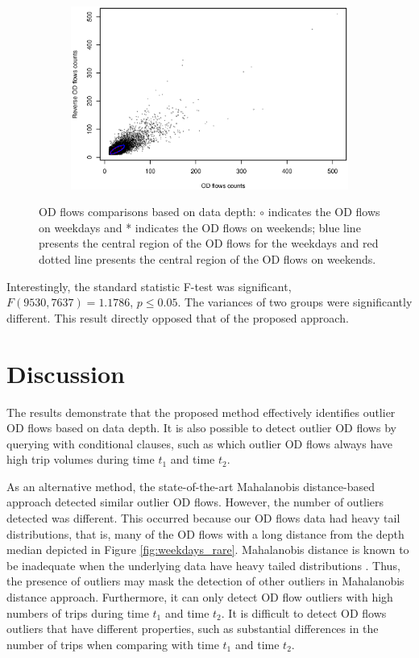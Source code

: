 \documentclass[a4paper,UKenglish]{lipics-v2018}
\begin{document}
\begin{figure}
	\centering
	\begin{subfigure}[b]{0.7\textwidth}
		\includegraphics[width=\textwidth]{images/com_weekdays_weekends.eps}
	\end{subfigure}
	\caption{OD flows comparisons based on data depth: $\circ$ indicates the OD flows on weekdays and * indicates the OD flows on weekends; blue line presents the central region of the OD flows for the weekdays and red dotted line presents the central region of the OD flows on weekends. }\label{fig:OD_comparisons}	
\end{figure}

Interestingly, the standard statistic F-test was significant, $F(9530,7637) =1.1786$, $p \leq 0.05$.
The variances of two groups were significantly different. 
This result directly opposed that of the proposed approach.


\section{Discussion}
\label{sec:discussion}
The results demonstrate that the proposed method effectively identifies outlier OD flows based on data depth.
It is also possible to detect outlier OD flows by querying with conditional clauses, such as which outlier OD flows always have high trip volumes during time $t_1$ and time $t_2$.

As an alternative method, the state-of-the-art Mahalanobis distance-based approach detected similar outlier OD flows.
However, the number of outliers detected was different.
This occurred because our OD flows data had heavy tail distributions, that is, many of the OD flows with a long distance from the depth median depicted in Figure \ref{fig:weekdays_rare}. 
Mahalanobis distance is known to be inadequate when the underlying data have heavy tailed distributions \cite{wilcox12Book}. 
Thus, the presence of outliers may mask the detection of other outliers in Mahalanobis distance approach.
Furthermore, it can only detect OD flow outliers with high numbers of trips during time $t_1$ and time $t_2$. 
It is difficult to detect OD flows outliers that have different properties, such as substantial differences in the number of trips when comparing with time $t_1$ and time $t_2$.
\end{document}
